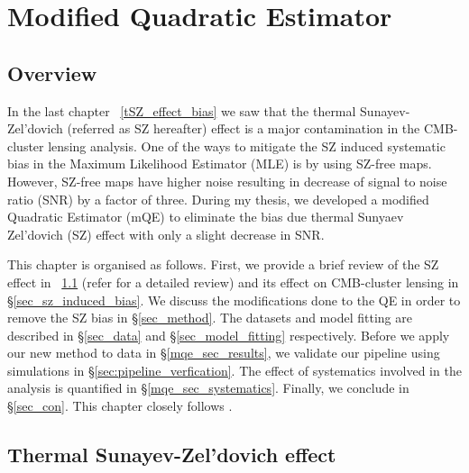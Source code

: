 \chapter{Modified Quadratic Estimator}
\label{ch:mqe}
\section*{Overview}\label{ovr}
In the last chapter ~\ref{tSZ_effect_bias} we saw that the thermal Sunayev-Zel'dovich (referred as SZ hereafter) effect is a major contamination in the CMB-cluster lensing analysis. 
One of the ways to mitigate the SZ induced systematic bias in the Maximum Likelihood Estimator (MLE) is by using SZ-free maps.
However, SZ-free maps have higher noise resulting in decrease of signal to noise ratio (SNR) by a factor of three. 
 During my thesis, we developed a modified Quadratic Estimator (mQE) to eliminate the bias due thermal Sunyaev Zel'dovich (SZ) effect with only a slight decrease in SNR. 


This chapter is organised as follows. First, we provide a brief review of the SZ effect in ~\ref{SZ} (refer \cite{sunyaev70b} for a detailed review) and its effect on CMB-cluster lensing in \S\ref{sec_sz_induced_bias}.
We discuss the modifications done to the QE in order to remove the SZ bias in \S\ref{sec_method}.
 The datasets and model fitting are described in  \S\ref{sec_data} and \S\ref{sec_model_fitting} respectively.
 Before we apply our new method to data in \S\ref{mqe_sec_results}, we validate our pipeline using simulations in \S\ref{sec:pipeline_verfication}. The effect of systematics involved in the analysis  is quantified in \S\ref{mqe_sec_systematics}.
Finally, we conclude in \S\ref{sec_con}. %
This chapter closely follows \citet{raghunathan18}.%


\section{Thermal Sunayev-Zel'dovich effect}\label{SZ}

